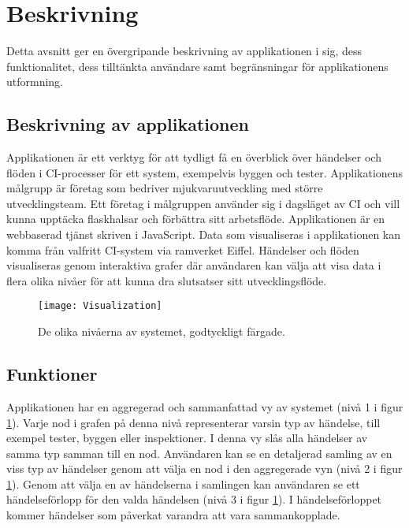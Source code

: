 \section{Beskrivning}
Detta avsnitt ger en övergripande beskrivning av applikationen i sig, dess funktionalitet, dess tilltänkta användare samt begränsningar för applikationens utformning.

\subsection{Beskrivning av applikationen}
Applikationen är ett verktyg för att tydligt få en överblick över händelser och flöden i CI-processer för ett system, exempelvis byggen och tester. Applikationens målgrupp är företag som bedriver mjukvaruutveckling med större utvecklingsteam. Ett företag i målgruppen använder sig i dagsläget av CI och vill kunna upptäcka flaskhalsar och förbättra sitt arbetsflöde. Applikationen är en webbaserad tjänst skriven i JavaScript. Data som visualiseras i applikationen kan komma från valfritt CI-system via ramverket Eiffel. Händelser och flöden visualiseras genom interaktiva grafer där användaren kan välja att visa data i flera olika nivåer för att kunna dra slutsatser sitt utvecklingsflöde. 

\begin{figure}[h]
    \centering
    \texttt{[image: Visualization]}
    \caption{De olika nivåerna av systemet, godtyckligt färgade.}
    \label{fig:system_overview}
\end{figure}
	
\subsection{Funktioner}
Applikationen har en aggregerad och sammanfattad vy av systemet (nivå 1 i figur \ref{fig:system_overview}). Varje nod i grafen på denna nivå representerar varsin typ av händelse, till exempel tester, byggen eller inspektioner. I denna vy slås alla händelser av samma typ samman till en nod. Användaren kan se en detaljerad samling av en viss typ av händelser genom att välja en nod i den aggregerade vyn (nivå 2 i figur \ref{fig:system_overview}). Genom att välja en av händelserna i samlingen kan användaren se ett händelseförlopp för den valda händelsen (nivå 3 i figur \ref{fig:system_overview}). I händelseförloppet kommer händelser som påverkat varandra att vara sammankopplade. 

\newpage


